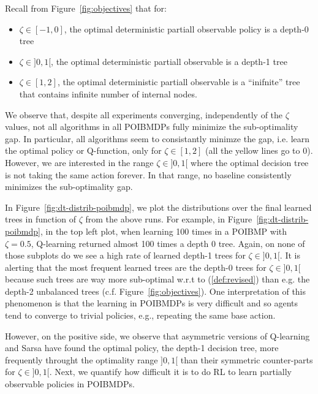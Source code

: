 Recall from Figure~\ref{fig:objectives} that for:
\begin{itemize}
    \item $\zeta\in [-1, 0]$, the optimal deterministic partiall observable policy is a depth-0 tree
    \item $\zeta\in ]0, 1[$, the optimal deterministic partiall observable is a depth-1 tree
    \item $\zeta\in [1, 2]$, the optimal deterministic partiall observable is a ``inifnite'' tree that contains infinite number of internal nodes.
\end{itemize}
We observe that, despite all experiments converging, independently of the $\zeta$ values, not all algorithms in all POIBMDPs fully minimize the sub-optimality gap.
In particular, all algorithms seem to consistantly minimze the gap, i.e. learn the optimal policy or Q-function, only for $\zeta \in [1, 2]$ (all the yellow lines go to 0).
However, we are interested in the range $\zeta\in ]0, 1[$ where the optimal decision tree is not taking the same action forever.
In that range, no baseline consistently minimizes the sub-optimality gap.


In Figure~\ref{fig:dt-distrib-poibmdp}, we plot the distributions over the final learned trees in function of $\zeta$ from the above runs.
For example, in Figure~\ref{fig:dt-distrib-poibmdp}, in the top left plot, when learning 100 times in a POIBMP with $\zeta=0.5$, Q-learning returned almost 100 times a depth 0 tree.
Again, on none of those subplots do we see a high rate of learned depth-1 trees for $\zeta\in ]0, 1[$.
It is alerting that the most frequent learned trees are the depth-0 trees for $\zeta\in ]0, 1[$ because such trees are way more sub-optimal w.r.t to (\ref{def:revised}) than e.g. the depth-2 unbalanced trees (c.f. Figure~\ref{fig:objectives}).  
One interpretation of this phenomenon is that the learning in POIBMDPs is very difficult and so agents tend to converge to trivial policies, e.g., repeating the same base action.

However, on the positive side, we observe that asymmetric versions of Q-learning and Sarsa have found the optimal policy, the depth-1 decision tree, more frequently throught the optimality range $]0,1[$ than their symmetric counter-parts for $\zeta\in ]0, 1[$.
Next, we quantify how difficult it is to do RL to learn partially observable policies in POIBMDPs.

